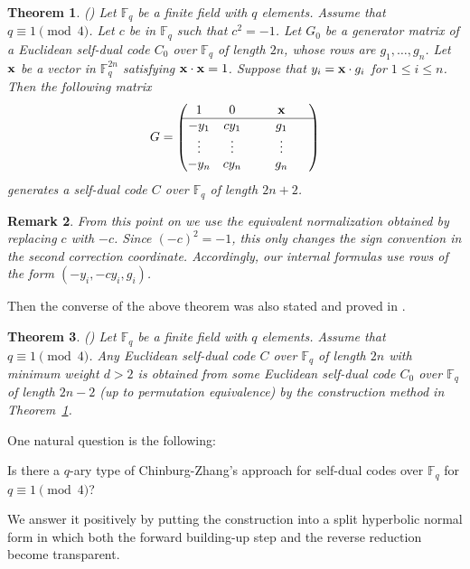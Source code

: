 \documentclass[12pt]{article}
\newtheorem{theorem}{Theorem}[section]
\newtheorem{remark}[theorem]{Remark}
\begin{document}
\begin{theorem}(\cite[Proposition 2.1]{LeeKim}) \label{thm-q-ary-build-1}
Let $\mathbb F_q$ be a finite field with $q$ elements. Assume that $q \equiv 1 \pmod{4}$. Let $c$ be in $\mathbb F_q$ such that $c^2 = -1$. Let $G_0$ be a generator matrix of a Euclidean self-dual code $C_0$ over $\mathbb F_q$ of length $2n$, whose rows are $g_1, \dots, g_n$. Let $\bf x$ be a vector in $\mathbb F_q^{2n}$ satisfying ${\bf x} \cdot {\bf x} = 1$. Suppose that $y_i ={\bf x} \cdot g_i$ for $1 \le i \le n$. Then the following matrix
\[
G=
\begin{pmatrix}
1 & 0 & ~~~~~ {\bf x} ~~~~~\\
\hline
-y_1 & c y_1 & ~~~~~ g_1 ~~~~~\\
\vdots & \vdots & ~~~~~ \vdots ~~~~~ \\
-y_{n} & c y_{n} & ~~~~~ g_{n} ~~~~~
\end{pmatrix}
\]
generates a self-dual code $C$ over $\mathbb F_q$ of length $2n+2$.
\end{theorem}

\begin{remark}
\rm
From this point on we use the equivalent normalization obtained by replacing $c$ with $-c$. Since $(-c)^2=-1$, this only changes the sign convention in the second correction coordinate. Accordingly, our internal formulas use rows of the form $(-y_i,-c y_i,g_i)$.
\end{remark}

 Then the converse of the above theorem was also stated and proved in \cite{LeeKim}.

\begin{theorem}(\cite[Proposition 2.2]{LeeKim}) \label{thm-q-ary-build-2}
Let $\mathbb F_q$ be a finite field with $q$ elements. Assume that $q \equiv 1 \pmod{4}$. Any Euclidean self-dual code $C$ over $\mathbb F_q$ of length $2n$ with minimum weight $d >2$ is obtained from some Euclidean self-dual code $C_0$ over $\mathbb F_q$ of length $2n-2$ (up to permutation equivalence) by the construction method in Theorem~\ref{thm-q-ary-build-1}.
\end{theorem}

One natural question is the following:

Is there a  $q$-ary type of Chinburg-Zhang's approach for self-dual codes over $\mathbb F_q$ for $q \equiv 1 \pmod{4}$?

We answer it positively by putting the construction into a split hyperbolic normal form in which both the forward building-up step and the reverse reduction become transparent.
\end{document}
